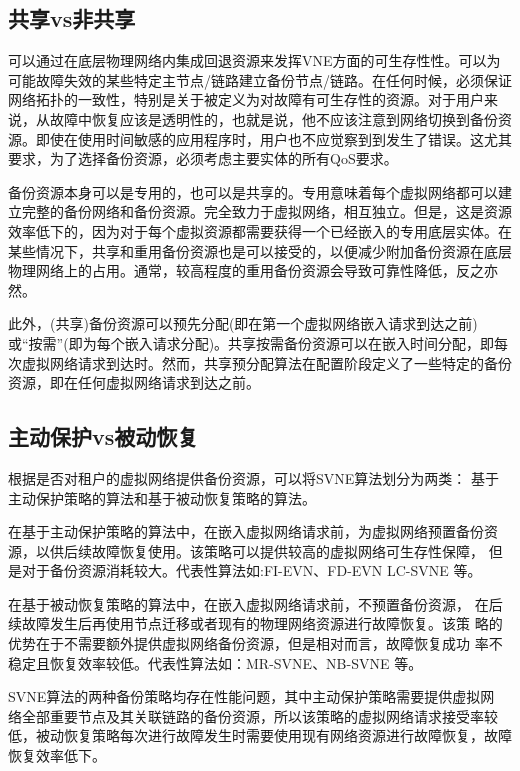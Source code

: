 \subsection{共享vs非共享}
可以通过在底层物理网络内集成回退资源来发挥VNE方面的可生存性性。可以为可能故障失效的某些特定主节点/链路建立备份节点/链路。在任何时候，必须保证网络拓扑的一致性，特别是关于被定义为对故障有可生存性的资源。对于用户来说，从故障中恢复应该是透明性的，也就是说，他不应该注意到网络切换到备份资源。即使在使用时间敏感的应用程序时，用户也不应觉察到到发生了错误。这尤其要求，为了选择备份资源，必须考虑主要实体的所有QoS要求。

备份资源本身可以是专用的，也可以是共享的\cite{guo2011shared}。专用意味着每个虚拟网络都可以建立完整的备份网络和备份资源。完全致力于虚拟网络，相互独立。但是，这是资源效率低下的，因为对于每个虚拟资源都需要获得一个已经嵌入的专用底层实体。在某些情况下，共享和重用备份资源也是可以接受的，以便减少附加备份资源在底层物理网络上的占用。通常，较高程度的重用备份资源会导致可靠性降低，反之亦然。

此外，(共享)备份资源可以预先分配(即在第一个虚拟网络嵌入请求到达之前)或“按需”(即为每个嵌入请求分配)。共享按需备份资源可以在嵌入时间分配，即每次虚拟网络请求到达\cite{guo2011shared,yeow2010designing,yu2011cost}时。然而，共享预分配算法在配置阶段定义了一些特定的备份资源，即在任何虚拟网络请求到达之前\cite{rahman2010survivable}。
\subsection{主动保护vs被动恢复}
根据是否对租户的虚拟网络提供备份资源，可以将SVNE算法划分为两类： 基于主动保护策略的算法和基于被动恢复策略的算法\cite{herker2013survey}。

在基于主动保护策略的算法中，在嵌入虚拟网络请求前，为虚拟网络预置备份资源，以供后续故障恢复使用。该策略可以提供较高的虚拟网络可生存性保障， 但是对于备份资源消耗较大。代表性算法如:FI-EVN\cite{yu2011cost}、FD-EVN\cite{wang2014survivable} LC-SVNE\cite{hu2012location} 等。

在基于被动恢复策略的算法中，在嵌入虚拟网络请求前，不预置备份资源， 在后续故障发生后再使用节点迁移或者现有的物理网络资源进行故障恢复。该策 略的优势在于不需要额外提供虚拟网络备份资源，但是相对而言，故障恢复成功 率不稳定且恢复效率较低。代表性算法如：MR-SVNE\cite{qiang2014heuristic}、NB-SVNE\cite{bo2014dynamic} 等。

SVNE算法的两种备份策略均存在性能问题，其中主动保护策略需要提供虚拟网 络全部重要节点及其关联链路的备份资源，所以该策略的虚拟网络请求接受率较 低，被动恢复策略每次进行故障发生时需要使用现有网络资源进行故障恢复，故障恢复效率低下。

